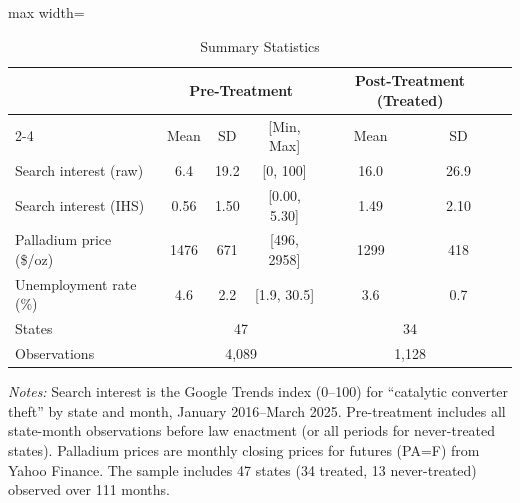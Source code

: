 \begin{table}[htbp]
\centering
\caption{Summary Statistics}
\label{tab:summary}
\begin{adjustbox}{max width=\textwidth}
\begin{tabular}{lcccccc}
\hline\hline
 & \multicolumn{3}{c}{Pre-Treatment} & \multicolumn{2}{c}{Post-Treatment (Treated)} \\
\cline{2-4} \cline{5-6}
 & Mean & SD & [Min, Max] & Mean & SD \\
\hline
Search interest (raw) & 6.4 & 19.2 & [0, 100] & 16.0 & 26.9 \\
Search interest (IHS) & 0.56 & 1.50 & [0.00, 5.30] & 1.49 & 2.10 \\
Palladium price (\$/oz) & 1476 & 671 & [496, 2958] & 1299 & 418 \\
Unemployment rate (\%) & 4.6 & 2.2 & [1.9, 30.5] & 3.6 & 0.7 \\
\hline
States & \multicolumn{3}{c}{47} & \multicolumn{2}{c}{34} \\
Observations & \multicolumn{3}{c}{4,089} & \multicolumn{2}{c}{1,128} \\
\hline\hline
\end{tabular}
\end{adjustbox}
\begin{tablenotes}[flushleft]
\small
\item \textit{Notes:} Search interest is the Google Trends index (0--100) for ``catalytic converter theft'' by state and month, January 2016--March 2025. Pre-treatment includes all state-month observations before law enactment (or all periods for never-treated states). Palladium prices are monthly closing prices for futures (PA=F) from Yahoo Finance. The sample includes 47 states (34 treated, 13 never-treated) observed over 111 months.
\end{tablenotes}
\end{table}

